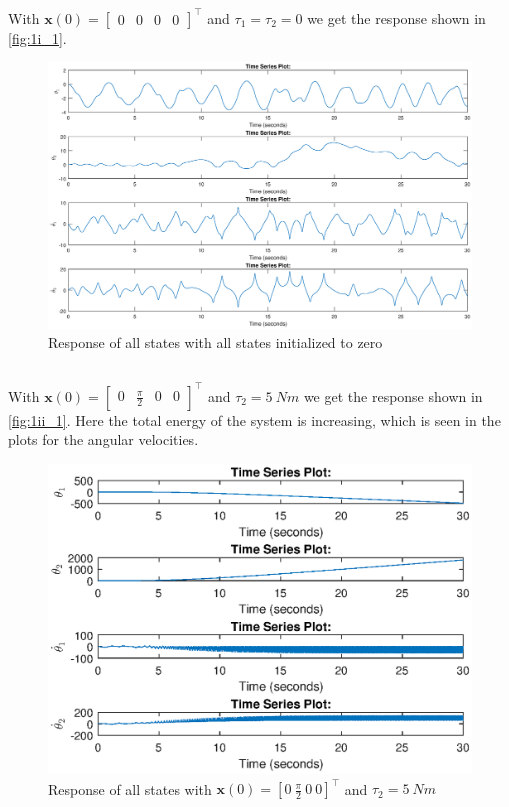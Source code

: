 \documentclass[a4paper]{scrartcl}
\begin{document}
\subsection{}
With $\bm{x}(0) = \begin{bmatrix}0 & 0 & 0 & 0\end{bmatrix}^\top$ and $\tau_1 = \tau_2 = 0$ we get the response shown in \autoref{fig:1i_1}.

\begin{figure}[ht!]
	\centering
	\includegraphics[width=.90\textwidth]{fig/1i_1.eps}
	\caption{Response of all states with all states initialized to zero}
	\label{fig:1i_1}
\end{figure}

\subsection{}
With $\bm{x}(0) = \begin{bmatrix}0 & \tfrac{\pi}{2} & 0 & 0\end{bmatrix}^\top$ and $\tau_2 = \SI{5}{Nm}$ we get the response shown in \autoref{fig:1ii_1}. Here the total energy of the system is increasing, which is seen in the plots for the angular velocities.

\begin{figure}[ht!]
	\centering
	\includegraphics[width=.90\textwidth]{fig/1ii_1.eps}
	\caption{Response of all states with  $\bm{x}(0) = \left[0 \: \tfrac{\pi}{2} \: 0 \: 0\right]^\top$ and $\tau_2 = \SI{5}{Nm}$}
	\label{fig:1ii_1}
\end{figure}
\end{document}

